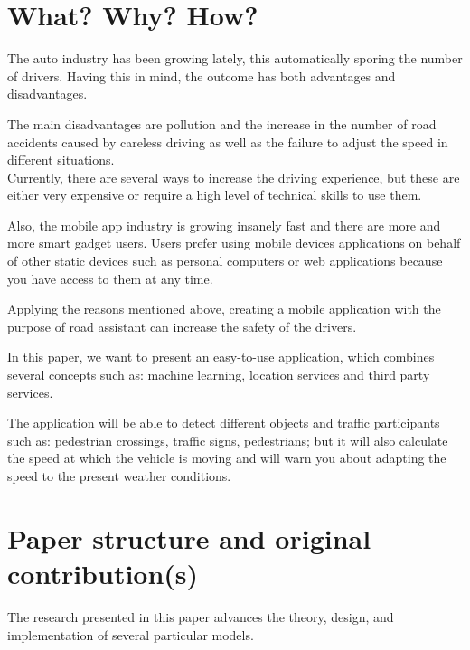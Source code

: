 \documentclass[12pt]{report}
\renewcommand{\_}{\kern-1.5pt\textunderscore\kern-1.5pt}
\begin{document}
\section{What? Why? How?}
\begin{justify}
The auto industry has been growing lately, this automatically sporing the number of drivers. Having this in mind, the outcome has both advantages and disadvantages.
\end{justify}\par

\begin{justify}
The main disadvantages are pollution and the increase in the number of road accidents caused by careless driving as well as the failure to adjust the speed in different situations.\\
Currently, there are several ways to increase the driving experience, but these are either very expensive or require a high level of technical skills to use them.
\end{justify}\par

\begin{justify}
Also, the mobile app industry is growing insanely fast and there are more and more smart gadget users. Users prefer using mobile devices applications on behalf of other static devices such as personal computers or web applications because you have access to them at any time. 
\end{justify}\par

\tab Applying the reasons mentioned above, creating a mobile application with the purpose of road assistant can increase the safety of the drivers.\par

\tab In this paper, we want to present an easy-to-use application, which combines several concepts such as: machine learning, location services and third party services.\par

The application will be able to detect different objects and traffic participants such as: pedestrian crossings, traffic signs, pedestrians; but it will also calculate the speed at which the vehicle is moving and will warn you about adapting the speed to the present weather conditions.\par


\vspace{\baselineskip}
\section{Paper structure and original contribution(s)}
\begin{justify}
The research presented in this paper advances the theory, design, and implementation of several particular models.
\end{justify}\par
\end{document}

